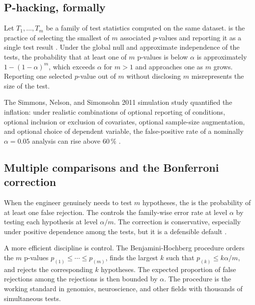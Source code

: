 \subsection{P-hacking, formally}

Let $T_{1}, \ldots, T_{m}$ be a family of test statistics computed
on the same dataset.  is the practice of
selecting the smallest of $m$ associated $p$-values and reporting
it as a single test result \cite{method:simmons-nelson-simonsohn-2011}.
Under the global null and approximate independence of the tests,
the probability that at least one of $m$ p-values is below $\alpha$
is approximately $1 - (1-\alpha)^{m}$, which exceeds $\alpha$ for
$m > 1$ and approaches one as $m$ grows. Reporting one selected
$p$-value out of $m$ without disclosing $m$ misrepresents the size
of the test.

The Simmons, Nelson, and Simonsohn 2011 simulation study quantified
the inflation: under realistic combinations of optional reporting
of conditions, optional inclusion or exclusion of covariates,
optional sample-size augmentation, and optional choice of dependent
variable, the false-positive rate of a nominally $\alpha = 0.05$
analysis can rise above $60\,\%$
\cite{method:simmons-nelson-simonsohn-2011}.

\subsection{Multiple comparisons and the Bonferroni correction}

When the engineer genuinely needs to test $m$ hypotheses, the
 is the probability of at least one
false rejection. The  controls the
family-wise error rate at level $\alpha$ by testing each hypothesis
at level $\alpha/m$. The correction is conservative, especially
under positive dependence among the tests, but it is a defensible
default \cite[ch.~10]{text:wasserman2004}.

A more efficient discipline is 
control. The Benjamini-Hochberg procedure orders the $m$ p-values
$p_{(1)} \leq \cdots \leq p_{(m)}$, finds the largest $k$ such that
$p_{(k)} \leq k\alpha/m$, and rejects the corresponding $k$
hypotheses. The expected proportion of false rejections among the
rejections is then bounded by $\alpha$. The procedure is the working
standard in genomics, neuroscience, and other fields with thousands
of simultaneous tests.

